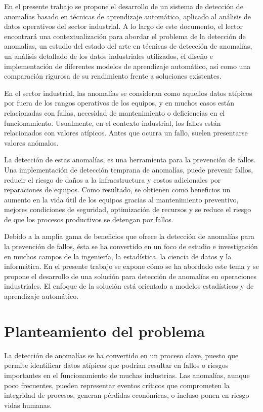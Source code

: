 \documentclass[11pt,a4paper,spanish]{book}
\numberwithin{equation}{chapter}
\numberwithin{figure}{chapter}
\begin{document}
En el presente trabajo se propone el desarrollo de un sistema de detección de anomalías
basado en técnicas de aprendizaje automático, aplicado al análisis de datos operativos
del sector industrial. A lo largo de este documento, el lector encontrará una 
contextualización para abordar el problema de la detección de anomalías, un estudio del
estado del arte en técnicas de detección de anomalías, un análisis detallado de los 
datos industriales utilizados, el diseño e implementación de diferentes modelos de 
aprendizaje automático, así como una comparación rigurosa de su rendimiento frente a 
soluciones existentes.


En el sector industrial, las anomalías se consideran como aquellos datos atípicos por 
fuera de los rangos operativos de los equipos, y en muchos casos están relacionadas con 
fallas, necesidad de mantenimiento o deficiencias en el funcionamiento. Usualmente, en 
el contexto industrial, los fallos están relacionados con valores atípicos. Antes que 
ocurra un fallo, suelen presentarse valores anómalos.  


La detección de estas anomalías, es una herramienta para la prevención de fallos. Una 
implementación de detección temprana de anomalías, puede prevenir fallos, reducir el 
riesgo de daños a la infraestructura y costos adicionales por reparaciones de equipos.
Como resultado, se obtienen como beneficios un aumento en la vida útil de los equipos 
gracias al mantenimiento preventivo, mejores condiciones de seguridad, optimización de
recursos y se reduce el riesgo de que los procesos productivos se detengan por fallos.  


Debido a la amplia gama de beneficios que ofrece la detección de anomalías para la 
prevención de fallos, ésta se ha convertido en un foco de estudio e investigación en 
muchos campos de la ingeniería, la estadística, la ciencia de datos y la informática.
En el presente trabajo se expone cómo se ha abordado este tema y se propone el 
desarrollo de una solución para detección de anomalías en operaciones industriales.
El enfoque de la solución está orientado a modelos estadísticos y de aprendizaje
automático. 


\section{Planteamiento del problema}

La detección de anomalías se ha convertido en un proceso clave, puesto que permite
identificar datos atípicos que podrían resultar en fallos o riesgos importantes en el
funcionamiento de muchas industrias. Las anomalías, aunque poco frecuentes, pueden 
representar eventos críticos que comprometen la integridad de procesos, generan 
pérdidas económicas, o incluso ponen en riesgo vidas humanas. 
\end{document}
